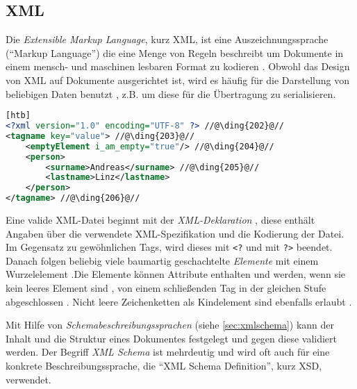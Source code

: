 \subsection{XML}

Die \emph{Extensible Markup Language}, kurz \gls{XML}, ist eine Auszeichnungssprache (\enquote{Markup Language}) die eine Menge von Regeln beschreibt um Dokumente in einem mensch- und maschinen lesbaren Format zu kodieren \cite{XML10Specification}. Obwohl das Design von XML auf Dokumente ausgerichtet ist, wird es häufig für die Darstellung von beliebigen Daten benutzt \cite{wiki:xml}, z.B. um diese für die Übertragung zu serialisieren.

\begin{lstlisting}[language=XML, caption=Minimalbeispiel für eine XML-Datei][htb]
<?xml version="1.0" encoding="UTF-8" ?> //@\ding{202}@//
<tagname key="value"> //@\ding{203}@//
    <emptyElement i_am_empty="true"/> //@\ding{204}@//
    <person>
        <surname>Andreas</surname> //@\ding{205}@//
        <lastname>Linz</lastname>
    </person>
</tagname> //@\ding{206}@//
\end{lstlisting}

Eine valide XML-Datei beginnt mit der \emph{XML-Deklaration} , diese enthält Angaben über die verwendete XML-Spezifikation und die Kodierung der Datei. 
Im Gegensatz zu gewöhnlichen Tags, wird dieses mit \texttt{<?} und mit \texttt{?>} beendet. 
Danach folgen beliebig viele baumartig geschachtelte \emph{Elemente} mit einem Wurzelelement .Die Elemente können Attribute enthalten und werden, wenn sie kein leeres Element sind , von einem schließenden Tag in der gleichen Stufe abgeschlossen . Nicht leere Zeichenketten als Kindelement sind ebenfalls erlaubt .

Mit Hilfe von \emph{Schemabeschreibungssprachen} (siehe \cref{sec:xmlschema}) kann der Inhalt und die Struktur eines Dokumentes festgelegt und gegen diese validiert werden. Der Begriff \emph{XML Schema} ist mehrdeutig und wird oft auch für eine konkrete Beschreibungssprache, die \enquote{XML Schema Definition}, kurz \gls{XSD}, verwendet.

